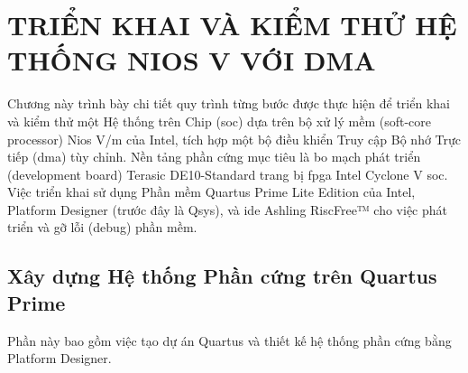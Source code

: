 \chapter{TRIỂN KHAI VÀ KIỂM THỬ HỆ THỐNG NIOS V VỚI DMA}
\label{Chapter3} %

Chương này trình bày chi tiết quy trình từng bước được thực hiện để triển khai và kiểm thử một Hệ thống trên Chip (\acrshort{soc}) dựa trên bộ xử lý mềm (soft-core processor) Nios V/m của Intel, tích hợp một bộ điều khiển Truy cập Bộ nhớ Trực tiếp (\acrfull{dma}) tùy chỉnh. Nền tảng phần cứng mục tiêu là bo mạch phát triển (development board) Terasic DE10-Standard \cite{terasicDE10Std} trang bị \acrshort{fpga} Intel Cyclone V \acrshort{soc}. Việc triển khai sử dụng Phần mềm Quartus Prime Lite Edition của Intel, Platform Designer (trước đây là Qsys), và \acrshort{ide} Ashling RiscFree™ \cite{ashling_riscfree_guide} cho việc phát triển và gỡ lỗi (debug) phần mềm.

\section{Xây dựng Hệ thống Phần cứng trên Quartus Prime}
\label{sec:build_hardware}

Phần này bao gồm việc tạo dự án Quartus và thiết kế hệ thống phần cứng bằng Platform Designer.

